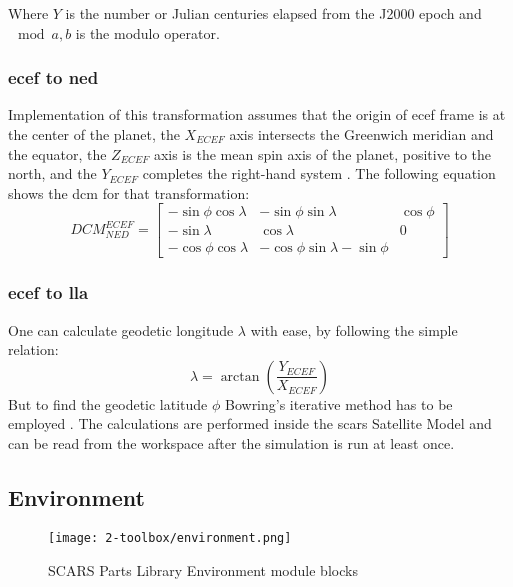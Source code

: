         Where $Y$ is the number or Julian centuries elapsed from the J2000 epoch and $\mod{a,b}$ is the modulo operator.

    \subsubsection{\ac{ecef} to \ac{ned}}
       Implementation of this transformation assumes that the origin of \ac{ecef} frame is at the center of the planet, the $X_{ECEF}$ axis intersects the Greenwich meridian and the equator, the $Z_{ECEF}$ axis is the mean spin axis of the planet, positive to the north, and the $Y_{ECEF}$ completes the right-hand system \cite{aboutareospace}. The following equation shows the \ac{dcm} for that transformation:
       \begin{equation}
           DCM^{ECEF}_{NED} = \begin{bmatrix} -\sin\phi\cos\lambda & -\sin\phi\sin\lambda & \cos\phi\\
               -\sin\lambda & \cos\lambda & 0 \\
               -\cos\phi\cos\lambda & -\cos\phi\sin\lambda -\sin\phi \end{bmatrix}
       \end{equation}

    \subsubsection{\ac{ecef} to \ac{lla}}
        One can calculate geodetic longitude $\lambda$ with ease, by following the simple relation:
        \begin{equation}
            \lambda = \arctan(\frac{Y_{ECEF}}{X_{ECEF}})
        \end{equation}
        But to find the geodetic latitude $\phi$ Bowring's iterative method has to be employed \cite{gerdan1999transforming}. The calculations are performed inside the \ac{scars} Satellite Model and can be read from the workspace after the simulation is run at least once.


\subsection{Environment}\label{sec:environment}

    \begin{figure}[H]
        \centering
        \texttt{[image: 2-toolbox/environment.png]}
        \caption{SCARS Parts Library Environment module blocks}
        \label{fig:environment}
    \end{figure}

